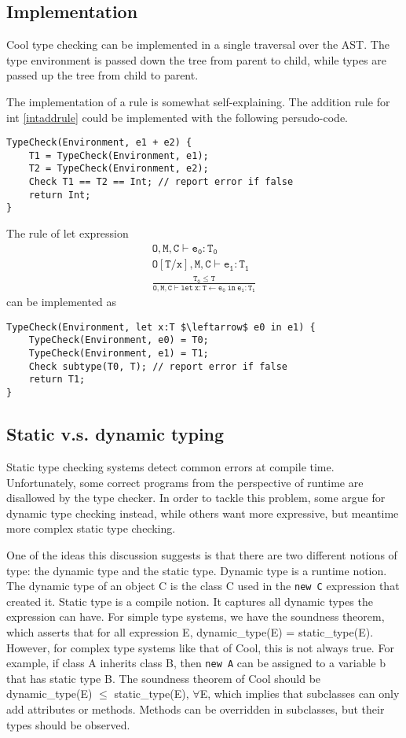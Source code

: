 \subsection{Implementation}
Cool type checking can be implemented in a single traversal over the AST. The type environment is passed down the tree from parent to child, while types are passed up the tree from child to parent.

The implementation of a rule is somewhat self-explaining. The addition rule for int \eqref{intaddrule} could be implemented with the following persudo-code.
\begin{lstlisting}
TypeCheck(Environment, e1 + e2) {
	T1 = TypeCheck(Environment, e1);
	T2 = TypeCheck(Environment, e2);
	Check T1 == T2 == Int; // report error if false
	return Int;
}
\end{lstlisting}
The rule of {\sf let} expression 
\begin{gather*}
\mathtt{O,M,C\vdash e_0:T_0}\\
\mathtt{O[T/x],M,C\vdash e_1:T_1}\\
\mathtt{\frac{T_0\leq T}{ O,M,C\vdash let\:x:T\leftarrow e_0\:in\:e_1:T_1}}
\end{gather*}
can be implemented as 
\begin{lstlisting}[mathescape = true]
TypeCheck(Environment, let x:T $\leftarrow$ e0 in e1) {
	TypeCheck(Environment, e0) = T0;
	TypeCheck(Environment, e1) = T1;
	Check subtype(T0, T); // report error if false
	return T1;
}
\end{lstlisting}
\subsection{Static v.s. dynamic typing}
Static type checking systems detect common errors at compile time. Unfortunately, some correct programs from the perspective of runtime are disallowed by the type checker. In order to tackle this problem, some argue for dynamic type checking instead, while others want more expressive, but meantime more complex static type checking. 

One of the ideas this discussion suggests is that there are two different notions of type: the dynamic type and the static type. Dynamic type is a runtime notion. The dynamic type of an object C is the class C used in the \texttt{new C} expression that created it. Static type is a compile notion. It captures all dynamic types the expression can have. For simple type systems, we have the soundness theorem, which asserts that for all expression E, dynamic\_type(E) = static\_type(E). However, for complex type systems like that of Cool, this is not always true. For example, if class A inherits class B, then \texttt{new A} can be assigned to a variable b that has static type B. The soundness theorem of Cool should be dynamic\_type(E) $\leq$ static\_type(E), $\forall$E, which implies that subclasses can only add attributes or methods. Methods can be overridden in subclasses, but their types should be observed.

